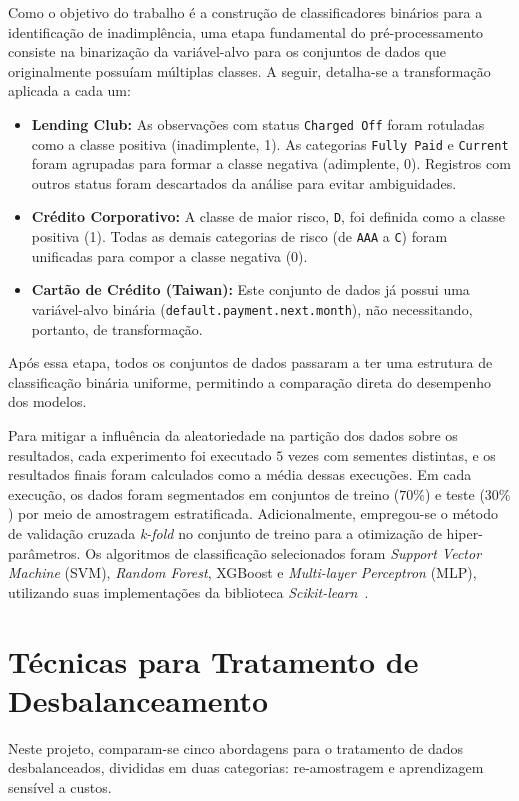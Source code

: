 Como o objetivo do trabalho é a construção de classificadores binários para a identificação de inadimplência, uma etapa fundamental do pré-processamento consiste na binarização da variável-alvo para os conjuntos de dados que originalmente possuíam múltiplas classes. A seguir, detalha-se a transformação aplicada a cada um:
\begin{itemize}
  \item \textbf{Lending Club:} As observações com status \texttt{Charged Off} foram rotuladas como a classe positiva (inadimplente, 1). As categorias \texttt{Fully Paid} e \texttt{Current} foram agrupadas para formar a classe negativa (adimplente, 0). Registros com outros status foram descartados da análise para evitar ambiguidades.
  \item \textbf{Crédito Corporativo:} A classe de maior risco, \texttt{D}, foi definida como a classe positiva (1). Todas as demais categorias de risco (de \texttt{AAA} a \texttt{C}) foram unificadas para compor a classe negativa (0).
  \item \textbf{Cartão de Crédito (Taiwan):} Este conjunto de dados já possui uma variável-alvo binária (\texttt{default.payment.next.month}), não necessitando, portanto, de transformação.
\end{itemize}
Após essa etapa, todos os conjuntos de dados passaram a ter uma estrutura de classificação binária uniforme, permitindo a comparação direta do desempenho dos modelos.

Para mitigar a influência da aleatoriedade na partição dos dados sobre os resultados, cada experimento foi executado \(5\) vezes com sementes distintas, e os resultados finais foram calculados como a média dessas execuções. Em cada execução, os dados foram segmentados em conjuntos de treino (\(70\%\)) e teste (\(30\%\)) por meio de amostragem estratificada. Adicionalmente, empregou-se o método de validação cruzada \textit{k-fold} no conjunto de treino para a otimização de hiper-parâmetros. Os algoritmos de classificação selecionados foram \textit{Support Vector Machine} (SVM), \textit{Random Forest}, XGBoost e \textit{Multi-layer Perceptron} (MLP), utilizando suas implementações da biblioteca \textit{Scikit-learn}~\cite{Pedregosa2011scikit}.

\section{Técnicas para Tratamento de Desbalanceamento}\label{sec:tecnicas}

Neste projeto, comparam-se cinco abordagens para o tratamento de dados desbalanceados, divididas em duas categorias: re-amostragem e aprendizagem sensível a custos.

